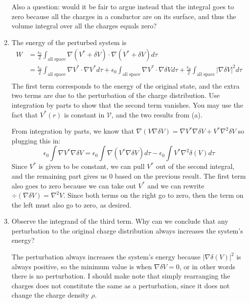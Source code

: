\documentclass[10pt]{article}
\newcommand{\laplace}{\nabla^2}
\begin{document}
\begin{enumerate}[label=\arabic*.]
\begin{solution}
				Also a question: would it be fair to argue instead that the integral goes to zero because all 
				the charges in a conductor are on its surface, and thus the volume integral over all the charges
				equals zero?
			\end{solution}
		\item The energy of the perturbed system is 
			\begin{align*}
				W &= \frac{\epsilon_0}{2} \int_{\text{all space}} \nabla (V^* + \delta V) \cdot \nabla (V^* + 
				\delta V) d\tau\\
				  &= \frac{\epsilon_0}{2}\int_{\text{all space}} \nabla V^* \cdot \nabla  V^* d\tau + 
				  \epsilon_0\int_{\text{all space}} \nabla V^* \cdot \nabla \delta V d\tau + \frac{\epsilon_0}{2}
				  \int_{\text{all space}} |\nabla  \delta V|^2 d\tau\\
			\end{align*}
			The first term corresponds to the energy of the original state, and the extra two terms are due to
			the perturbation of the charge distribution. Use integration by parts to show that the second term
			vanishes. You may use the fact that $V^*(r)$ is constant in $\mathcal V$, and the two results from
			(a). 

			\begin{solution}
				From integration by parts, we know that $\nabla (V \nabla \delta V) = \nabla V^* \nabla \delta V
				+ V^*\laplace \delta V$ so plugging this in:
				\[
				\epsilon_0\int \nabla V^* \nabla \delta V = \epsilon_0\int \nabla(V^*\nabla \delta V) d\tau
				- \epsilon_0 \int V^* \laplace \delta(V) d\tau
				\] 
				Since $V^*$ is given to be constant, we can pull $V^*$ out of the second integral, and the 
				remaining part gives us 0 based on the previous result. The first term also goes to zero 
				because we can take out $V^*$ and we can rewrite $\div(\nabla \delta V) = \laplace V$. Since
				both terms on the right go to zero, then the term on the left must also go to zero, as desired. 
			\end{solution}
		\item Observe the integrand of the third term. Why can we conclude that any perturbation to the original
			charge distribution always increases the system's energy? 

			\begin{solution}
				The perturbation always increases the system's energy because $|\nabla \delta(V)|^2$
				is always positive, so the minimum value is when $\nabla \delta V = 0$, or in other words 
				there is no perturbation. I should make note that simply rearranging the charges does not
				constitute the same as a perturbation, since it does not change the charge density $\rho$. 
			\end{solution}
	\end{enumerate}
\end{document}
